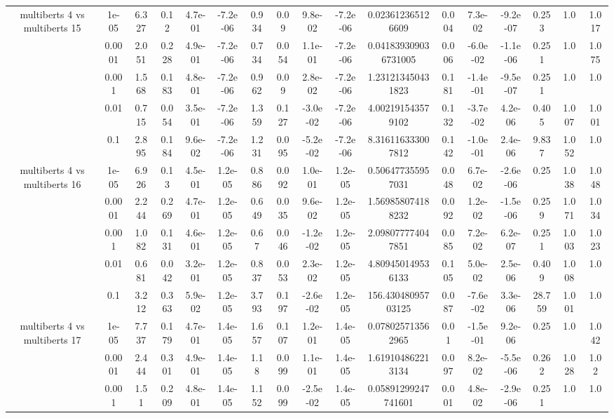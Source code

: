 \begin{tabular}{|c|c|c|c|c|c|c|c|c|c|c|c|c|c|c|c|c|}
\hline
\multirow{5}{*}{multiberts 4 vs multiberts 15} & 1e-05 & 6.327 & 0.12 & 4.7e-01 & -7.2e-06 & 0.934 & 0.09 & 9.8e-02 & -7.2e-06 & 0.023612365126609 & 0.004 & 7.3e-02 & -9.2e-07 & 0.253 & 1.0 & 1.017 \\
 & 0.0001 & 2.051 & 0.228 & 4.9e-01 & -7.2e-06 & 0.734 & 0.054 & 1.1e-01 & -7.2e-06 & 0.041839309036731005 & 0.006 & -6.0e-02 & -1.1e-06 & 0.251 & 1.0 & 1.075 \\
 & 0.001 & 1.568 & 0.183 & 4.8e-01 & -7.2e-06 & 0.962 & 0.09 & 2.8e-02 & -7.2e-06 & 1.231213450431823 & 0.181 & -1.4e-01 & -9.5e-07 & 0.251 & 1.0 & 1.0 \\
 & 0.01 & 0.715 & 0.054 & 3.5e-01 & -7.2e-06 & 1.359 & 0.127 & -3.0e-02 & -7.2e-06 & 4.002191543579102 & 0.132 & -3.7e-02 & 4.2e-06 & 0.405 & 1.007 & 1.001 \\
 & 0.1 & 2.895 & 0.184 & 9.6e-02 & -7.2e-06 & 1.231 & 0.095 & -5.2e-02 & -7.2e-06 & 8.316116333007812 & 0.142 & -1.0e-01 & 2.4e-06 & 9.837 & 1.052 & 1.0 \\
\hline
\multirow{5}{*}{multiberts 4 vs multiberts 16} & 1e-05 & 6.926 & 0.13 & 4.5e-01 & 1.2e-05 & 0.886 & 0.092 & 1.0e-01 & 1.2e-05 & 0.506477355957031 & 0.048 & 6.7e-02 & -2.6e-06 & 0.25 & 1.038 & 1.048 \\
 & 0.0001 & 2.244 & 0.269 & 4.7e-01 & 1.2e-05 & 0.649 & 0.035 & 9.6e-02 & 1.2e-05 & 1.569858074188232 & 0.092 & 1.2e-02 & -1.5e-06 & 0.259 & 1.071 & 1.034 \\
 & 0.001 & 1.082 & 0.131 & 4.6e-01 & 1.2e-05 & 0.67 & 0.046 & -1.2e-02 & 1.2e-05 & 2.098077774047851 & 0.085 & 7.2e-02 & 6.2e-07 & 0.251 & 1.003 & 1.023 \\
 & 0.01 & 0.681 & 0.042 & 3.2e-01 & 1.2e-05 & 0.837 & 0.053 & 2.3e-02 & 1.2e-05 & 4.809450149536133 & 0.105 & 5.0e-02 & 2.5e-06 & 0.409 & 1.008 & 1.0 \\
 & 0.1 & 3.212 & 0.363 & 5.9e-02 & 1.2e-05 & 3.793 & 0.197 & -2.6e-02 & 1.2e-05 & 156.43048095703125 & 0.087 & -7.6e-02 & 3.3e-06 & 28.759 & 1.001 & 1.0 \\
\hline
\multirow{5}{*}{multiberts 4 vs multiberts 17} & 1e-05 & 7.737 & 0.179 & 4.7e-01 & 1.4e-05 & 1.657 & 0.107 & 1.2e-01 & 1.4e-05 & 0.078025713562965 & 0.01 & -1.5e-01 & 9.2e-06 & 0.25 & 1.0 & 1.042 \\
 & 0.0001 & 2.444 & 0.301 & 4.9e-01 & 1.4e-05 & 1.18 & 0.099 & 1.1e-01 & 1.4e-05 & 1.619104862213134 & 0.097 & 8.2e-02 & -5.5e-06 & 0.262 & 1.028 & 1.02 \\
 & 0.001 & 1.51 & 0.209 & 4.8e-01 & 1.4e-05 & 1.152 & 0.099 & -2.5e-02 & 1.4e-05 & 0.05891299247741601 & 0.001 & 4.8e-02 & -2.9e-06 & 0.251 & 1.0 & 1.0 \\

\end{tabular}
